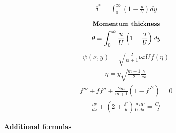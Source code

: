 \documentclass[10pt, a4paper]{article}
\begin{document}
\begin{multicols*}{2}
\begin{gather*}
        \delta^* = \int_0^\infty\left( 1 - \frac{u}{U} \right)dy
    \end{gather*}
    \begin{gather*}
        \textbf{\small Momentum thickness} \\
        \theta = \int_0^\infty \frac{u}{U}\left( 1 - \frac{u}{U} \right)dy
    \end{gather*}
    \begin{gather*}
        \psi(x,y) = \sqrt{\frac{2}{m+1}\nu x U}f(\eta)
    \end{gather*}
    \begin{gather*}
        \eta = y \sqrt{\frac{m+1}{2}\frac{U}{\nu x}}
    \end{gather*}
    \begin{gather*}
        f''' + ff'' + \frac{2m}{m+1}(1-f'^2)=0
    \end{gather*}
    \begin{gather*}
        \frac{d\theta}{dx} + \left( 2 + \frac{\delta^*}{\theta} \right)\frac{\theta}{U}\frac{dU}{dx} =
        \frac{C_f}{2}
    \end{gather*}
\end{multicols*}
\begin{center}
    \Large
    \textbf{Additional formulas}
    \vspace{0.5cm}
\end{center}
\end{document}
